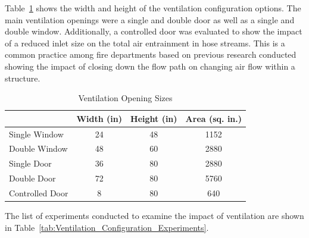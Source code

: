 \documentclass[12pt,oneside]{book}
\begin{document}
Table~\ref{tab:Vent_Sizes} shows the width and height of the ventilation configuration options. The main ventilation openings were a single and double door as well as a single and double window. Additionally, a controlled door was evaluated to show the impact of a reduced inlet size on the total air entrainment in hose streams. This is a common practice among fire departments based on previous research conducted showing the impact of closing down the flow path on changing air flow within a structure. 

\begin{table}[!ht]
\centering
\caption{Ventilation Opening Sizes}\label{tab:Vent_Sizes}
\begin{tabular}{lccc}
\toprule[1.5pt]
 & Width (in) & Height (in) & Area (sq. in.) \\ 
\midrule
Single Window        & 24 & 48 & 1152 \\
Double Window        & 48 & 60 & 2880 \\
Single Door          & 36 & 80 & 2880 \\
Double Door          & 72 & 80 & 5760 \\
Controlled Door      & 8  & 80 & 640 \\ 
\bottomrule[1.25pt]
\end{tabular}
\end{table}

The list of experiments conducted to examine the impact of ventilation are shown in Table~\ref{tab:Ventilation_Configuration_Experiments}. 
\end{document}
